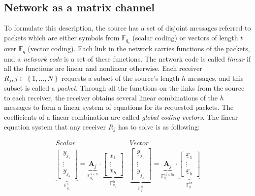 \subsection{Network as a matrix channel}

To formulate this description, the source has a set of disjoint messages
referred to packets which are either symbols from $\ensuremath{\mathbb{F}}_{q_{s}}$
(scalar coding) or vectors of length $t$ over $\ensuremath{\mathbb{F}}_{q}$
(vector coding). Each link in the network carries functions of the
packets, and a \textit{network code} is a set of these functions.
The network code is called \textit{linear} if all the functions are
linear and nonlinear otherwise. Each receiver $R_{j},j\in\left\{ 1,\ldots,N\right\} $
requests a subset of the source's length-$h$ messages, and this subset
is called a \textit{packet}. Through all the functions on the links
from the source to each receiver, the receiver obtains several linear
combinations of the $h$ messages to form a linear system of equations
for its requested packets. The coefficients of a linear combination
are called \textit{global coding vectors}. The linear equation system
that any receiver $R_{j}$ has to solve is as following:

\begin{equation}
\begin{array}{c|c}
Scalar & Vector\\
\underset{\ensuremath{\mathbb{F}}_{q_{s}}^{s}}{\underbrace{\left[\begin{array}{c}
y_{j_{1}}\\
\vdots\\
y_{j_{s}}
\end{array}\right]}}=\underset{\ensuremath{\mathbb{F}}_{q_{s}}^{s\times h}}{\underbrace{\boldsymbol{A}_{j}}}\cdot\underset{\ensuremath{\mathbb{F}}_{q_{s}}^{h}}{\underbrace{\left[\begin{array}{c}
x_{1}\\
\vdots\\
x_{h}
\end{array}\right]}} & \underset{\ensuremath{\mathbb{F}}_{q}^{st}}{\underbrace{\left[\begin{array}{c}
\underline{y}_{j_{1}}\\
\vdots\\
\underline{y}_{j_{s}}
\end{array}\right]}}=\underset{\ensuremath{\mathbb{F}}_{q}^{st\times th}}{\underbrace{\boldsymbol{A}_{j}}}\cdot\underset{\ensuremath{\mathbb{F}}_{q}^{th}}{\underbrace{\left[\begin{array}{c}
\underline{x}_{1}\\
\vdots\\
\underline{x}_{h}
\end{array}\right]}}
\end{array}\label{eq:linear_system}
\end{equation}

